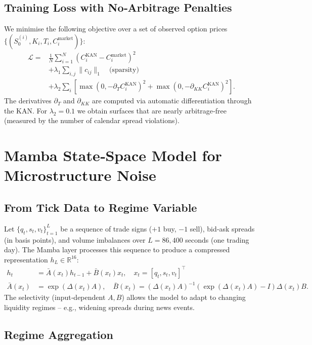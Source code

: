 \documentclass[12pt,a4paper]{article}
\begin{document}
\subsection{Training Loss with No‑Arbitrage Penalties}

We minimise the following objective over a set of observed option prices $\{(S_0^{(i)}, K_i, T_i, C_i^{\text{market}})\}$:
\begin{align}
\mathcal{L} = & \frac{1}{N}\sum_{i=1}^N \left( C_i^{\text{KAN}} - C_i^{\text{market}} \right)^2 \\
& + \lambda_1 \sum_{i,j} \|c_{ij}\|_1 \quad \text{(sparsity)} \\
& + \lambda_2 \sum_{i} \left[ \max(0, -\partial_T C_i^{\text{KAN}})^2 + \max(0, -\partial_{KK} C_i^{\text{KAN}})^2 \right].
\end{align}
The derivatives $\partial_T$ and $\partial_{KK}$ are computed via automatic differentiation through the KAN. For $\lambda_2 = 0.1$ we obtain surfaces that are nearly arbitrage‑free (measured by the number of calendar spread violations).

\section{Mamba State‑Space Model for Microstructure Noise}

\subsection{From Tick Data to Regime Variable}

Let $\{q_t, s_t, v_t\}_{t=1}^{L}$ be a sequence of trade signs ($+1$ buy, $-1$ sell), bid‑ask spreads (in basis points), and volume imbalances over $L=86{,}400$ seconds (one trading day). The Mamba layer processes this sequence to produce a compressed representation $h_L \in \mathbb{R}^{16}$:
\begin{align}
h_t &= \bar{A}(x_t) h_{t-1} + \bar{B}(x_t) x_t, \quad x_t = [q_t, s_t, v_t]^\top \\
\bar{A}(x_t) &= \exp(\Delta(x_t) A), \quad \bar{B}(x_t) = (\Delta(x_t) A)^{-1}(\exp(\Delta(x_t) A)-I)\Delta(x_t) B.
\end{align}
The selectivity (input‑dependent $A,B$) allows the model to adapt to changing liquidity regimes – e.g., widening spreads during news events.

\subsection{Regime Aggregation}
\end{document}
